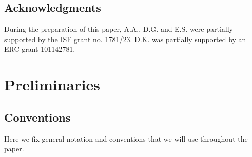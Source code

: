 \documentclass[12pt,a4paper]{amsart}%
\begin{document}
\subsection{Acknowledgments}
During the preparation of this paper, A.A., D.G. and E.S. were partially supported by the ISF grant no. 1781/23. 
D.K. was partially supported by an ERC grant 101142781.


\section{Preliminaries}\label{sec:prelim}
\subsection{Conventions}
Here we fix general notation and conventions that we will use throughout the paper.
\end{document}
